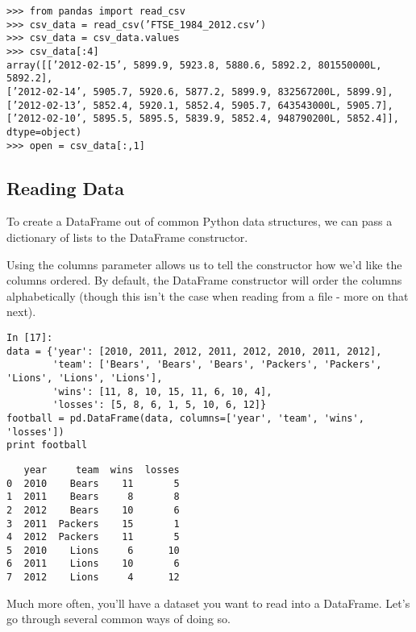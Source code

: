 \begin{framed}
\begin{verbatim}
>>> from pandas import read_csv
>>> csv_data = read_csv(’FTSE_1984_2012.csv’)
>>> csv_data = csv_data.values
>>> csv_data[:4]
array([[’2012-02-15’, 5899.9, 5923.8, 5880.6, 5892.2, 801550000L, 5892.2],
[’2012-02-14’, 5905.7, 5920.6, 5877.2, 5899.9, 832567200L, 5899.9],
[’2012-02-13’, 5852.4, 5920.1, 5852.4, 5905.7, 643543000L, 5905.7],
[’2012-02-10’, 5895.5, 5895.5, 5839.9, 5852.4, 948790200L, 5852.4]], dtype=object)
>>> open = csv_data[:,1]
\end{verbatim}
\end{framed}
\subsection{Reading Data}

To create a DataFrame out of common Python data structures, we can pass a dictionary of lists to the DataFrame constructor.

Using the columns parameter allows us to tell the constructor how we'd like the columns ordered. By default, the DataFrame constructor will order the columns alphabetically (though this isn't the case when reading from a file - more on that next).

\begin{framed}
\begin{verbatim}
In [17]:
data = {'year': [2010, 2011, 2012, 2011, 2012, 2010, 2011, 2012],
        'team': ['Bears', 'Bears', 'Bears', 'Packers', 'Packers', 'Lions', 'Lions', 'Lions'],
        'wins': [11, 8, 10, 15, 11, 6, 10, 4],
        'losses': [5, 8, 6, 1, 5, 10, 6, 12]}
football = pd.DataFrame(data, columns=['year', 'team', 'wins', 'losses'])
print football
\end{verbatim}
\end{framed}
\begin{verbatim}
   year     team  wins  losses
0  2010    Bears    11       5
1  2011    Bears     8       8
2  2012    Bears    10       6
3  2011  Packers    15       1
4  2012  Packers    11       5
5  2010    Lions     6      10
6  2011    Lions    10       6
7  2012    Lions     4      12
\end{verbatim}


Much more often, you'll have a dataset you want to read into a DataFrame. Let's go through several common ways of doing so.

